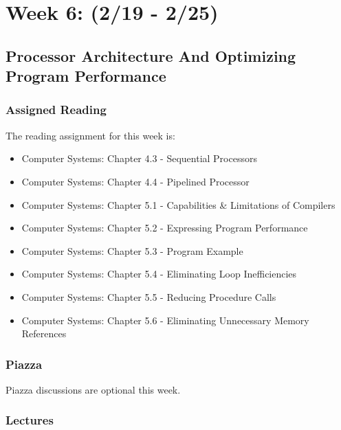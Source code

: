 \clearpage

\renewcommand{\ChapTitle}{Week 6: (2/19 - 2/25)}
\renewcommand{\SectionTitle}{Processor Architecture And Optimizing Program Performance}

\chapter{\ChapTitle}

\section{\SectionTitle}

\subsection{Assigned Reading}

The reading assignment for this week is:

\begin{itemize}
    \item Computer Systems: Chapter 4.3 - Sequential Processors
    \item Computer Systems: Chapter 4.4 - Pipelined Processor
    \item Computer Systems: Chapter 5.1 - Capabilities \& Limitations of Compilers
    \item Computer Systems: Chapter 5.2 - Expressing Program Performance
    \item Computer Systems: Chapter 5.3 - Program Example
    \item Computer Systems: Chapter 5.4 - Eliminating Loop Inefficiencies
    \item Computer Systems: Chapter 5.5 - Reducing Procedure Calls
    \item Computer Systems: Chapter 5.6 - Eliminating Unnecessary Memory References
\end{itemize}

\subsection{Piazza}

Piazza discussions are optional this week. 

\subsection{Lectures}


